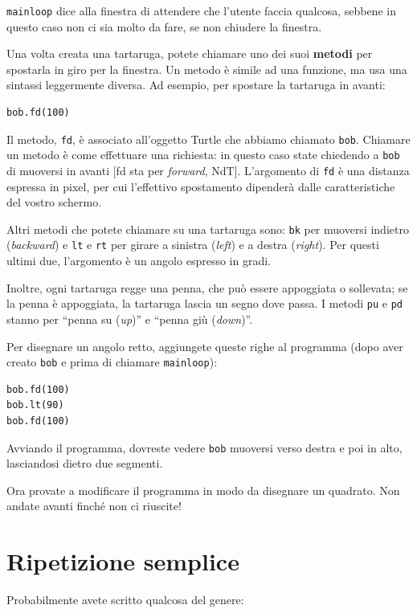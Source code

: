 \documentclass[10pt]{book}
\begin{document}
\verb"mainloop" dice alla finestra di attendere che l'utente faccia qualcosa, sebbene in questo caso non ci sia molto da fare, se non chiudere la finestra.

Una volta creata una tartaruga, potete chiamare uno dei suoi {\bf metodi} per spostarla in giro per la finestra.  Un metodo è simile ad una funzione, ma usa una sintassi leggermente diversa. Ad esempio, per spostare la tartaruga in avanti:

\begin{verbatim}
bob.fd(100)
\end{verbatim}
%
Il metodo, {\tt fd}, è associato all'oggetto Turtle che abbiamo chiamato
{\tt bob}.  
Chiamare un metodo è come effettuare una richiesta: in questo caso state chiedendo a {\tt bob} di muoversi in avanti [fd sta per {\em forward}, NdT].
L'argomento di {\tt fd} è una distanza espressa in pixel, per cui l'effettivo spostamento dipenderà dalle caratteristiche del vostro schermo.

Altri metodi che potete chiamare su una tartaruga sono: {\tt bk} per muoversi indietro ({\em backward}) e {\tt lt} e {\tt rt} per girare a sinistra ({\em left}) e a destra ({\em right}). Per questi ultimi due, l'argomento è un angolo espresso in gradi. 

Inoltre, ogni tartaruga regge una penna, che può essere appoggiata o sollevata; se la penna è appoggiata, la tartaruga lascia un segno dove passa. I metodi {\tt pu} e {\tt pd} stanno per ``penna su ({\em up})'' e ``penna giù ({\em down})''.

Per disegnare un angolo retto, aggiungete queste righe al programma (dopo aver creato {\tt bob} e prima di chiamare \verb"mainloop"):

\begin{verbatim}
bob.fd(100)
bob.lt(90)
bob.fd(100)
\end{verbatim}
%
Avviando il programma, dovreste vedere {\tt bob} muoversi verso destra e poi in alto, lasciandosi dietro due segmenti.

Ora provate a modificare il programma in modo da disegnare un quadrato. Non andate avanti finché non ci riuscite!


\section{Ripetizione semplice}
\label{repetition}

Probabilmente avete scritto qualcosa del genere:
\end{document}

